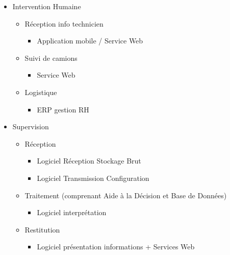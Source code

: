 \begin{itemize}
\item Intervention Humaine

\begin{itemize}
\item Réception info technicien

\begin{itemize}
\item Application mobile / Service Web
\end{itemize}

\item Suivi de camions

\begin{itemize}
\item Service Web
\end{itemize}

\item Logistique

\begin{itemize}
\item ERP gestion RH
\end{itemize}

\end{itemize}

\item Supervision

\begin{itemize}
\item Réception

\begin{itemize}
\item Logiciel Réception Stockage Brut
\item Logiciel Transmission Configuration
\end{itemize}

\item Traitement (comprenant Aide à la Décision et Base de Données)

\begin{itemize}
\item Logiciel interprétation
\end{itemize}

\item Restitution

\begin{itemize}
\item Logiciel présentation informations + Services Web
\end{itemize}   
            
\end{itemize}

\end{itemize}


